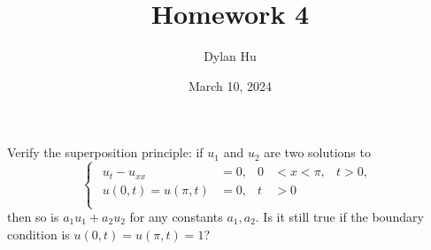 \documentclass[plain]{pset}
\title{Homework 4}
\author{Dylan Hu}
\date{March 10, 2024}
\begin{document}
\begin{multicols}{2}
    \raggedcolumns{}
    \maketitle
    \columnbreak{}
    \tableofcontents
\end{multicols}

\setlength{\parskip}{1em}
\setlength{\parindent}{0pt}

\pagebreak

\begin{problem}
Verify the superposition principle: if \(u_1\) and \(u_2\) are two solutions to
\[
    \begin{cases}
        \begin{aligned}
            u_t - u_{xx}        & = 0, & 0 & < x < \pi, & t > 0, \\
            u(0, t) = u(\pi, t) & = 0, & t & > 0                 \\
        \end{aligned}
    \end{cases}
\]
then so is \(a_1u_1 + a_2u_2\) for any constants \(a_1, a_2\). Is it still true if the boundary condition is \(u(0, t) = u(\pi, t) = 1\)?
\end{problem}
\end{document}

